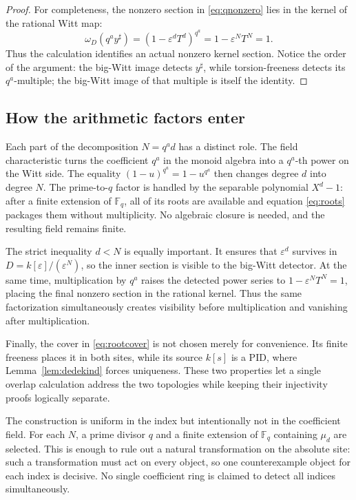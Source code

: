 \documentclass[11pt]{article}
\theoremstyle{definition}
\newcommand{\sh}{\sharp}
\begin{document}
\begin{proof}
For completeness, the nonzero section in \eqref{eq:qnonzero} lies in the
kernel of the rational Witt map:
\[
 \omega_D(q^a y^\sh)
  =(1-\varepsilon^dT^d)^{q^a}
  =1-\varepsilon^NT^N=1.
 \tag{4.13}\label{eq:inkernel}
\]
Thus the calculation identifies an actual nonzero kernel section.  Notice
the order of the argument: the big-Witt image detects
\(y^\sh\), while torsion-freeness detects its \(q^a\)-multiple; the
big-Witt image of that multiple is itself the identity.
\end{proof}

\subsection{How the arithmetic factors enter}\label{subsec:factors}

Each part of the decomposition \(N=q^a d\) has a distinct role.  The field
characteristic turns the coefficient \(q^a\) in the monoid algebra into a
\(q^a\)-th power on the Witt side.  The equality
\((1-u)^{q^a}=1-u^{q^a}\) then changes degree \(d\) into degree \(N\).
The prime-to-\(q\) factor is handled by the separable polynomial
\(X^d-1\): after a finite extension of \(\mathbb F_q\), all of its roots
are available and equation \eqref{eq:roots} packages them without
multiplicity.  No algebraic closure is needed, and the resulting field
remains finite.

The strict inequality \(d<N\) is equally important.  It ensures that
\(\varepsilon^d\) survives in
\(D=k[\varepsilon]/(\varepsilon^N)\), so the inner section is visible to
the big-Witt detector.  At the same time, multiplication by \(q^a\) raises
the detected power series to
\(1-\varepsilon^NT^N=1\), placing the final nonzero section in the rational
kernel.  Thus the same factorization simultaneously creates visibility
before multiplication and vanishing after multiplication.

Finally, the cover in \eqref{eq:rootcover} is not chosen merely for
convenience.  Its finite freeness places it in both sites, while its source
\(k[s]\) is a PID, where Lemma~\ref{lem:dedekind} forces uniqueness.
These two properties let a single overlap calculation address the two
topologies while keeping their injectivity proofs logically separate.

The construction is uniform in the index but intentionally not in the
coefficient field.  For each \(N\), a prime divisor \(q\) and a finite
extension of \(\mathbb F_q\) containing \(\mu_d\) are selected.  This is
enough to rule out a natural transformation on the absolute site: such a
transformation must act on every object, so one counterexample object for
each index is decisive.  No single coefficient ring is claimed to detect
all indices simultaneously.
\end{document}
